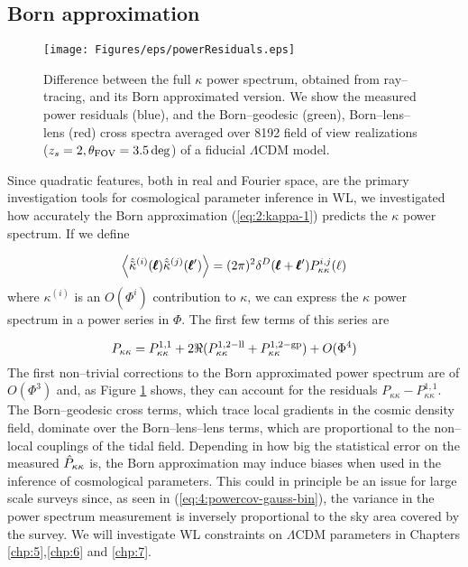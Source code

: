 \subsection{Born approximation}
\label{sec:4:bornpower}
%
\begin{figure}
\begin{center}
\texttt{[image: Figures/eps/powerResiduals.eps]}
\end{center}
\caption{Difference between the full $\kappa$ power spectrum, obtained from ray--tracing, and its Born approximated version. We show the measured power residuals (blue), and the Born--geodesic (green), Born--lens--lens (red) cross spectra averaged over 8192 field of view realizations ($z_s=2, \theta_{\rm FOV}=3.5\,{\rm deg}$) of a fiducial $\Lambda$CDM model.}
\label{fig:4:powerRes}
\end{figure}
%
Since quadratic features, both in real and Fourier space, are the primary investigation tools for cosmological parameter inference in WL, we investigated how accurately the Born approximation (\ref{eq:2:kappa-1}) predicts the $\kappa$ power spectrum. If we define 

\begin{equation}
\label{eq:4:power-cross}
\left\langle\hat{\tilde{\kappa}}^{(i)}(\pmb{\ell})\hat{\tilde{\kappa}}^{(j)}(\pmb{\ell}')\right\rangle = (2\pi)^2\delta^D(\pmb{\ell}+\pmb{\ell}')P^{i,j}_{\kappa\kappa}(\ell)
\end{equation}
%
where $\kappa^{(i)}$ is an $O(\Phi^i)$ contribution to $\kappa$, we can express the $\kappa$ power spectrum in a power series in $\Phi$. The first few terms of this series are 

\begin{equation}
\label{eq:4:power-pert}
P_{\kappa\kappa} = P_{\kappa\kappa}^{1,1} + 2\Re (P^{1,2-{\rm ll}}_{\kappa\kappa}+P^{1,2-{\rm gp}}_{\kappa\kappa}) + O(\Phi^4) 
\end{equation}
%
The first non--trivial corrections to the Born approximated power spectrum are of $O(\Phi^3)$ and, as Figure \ref{fig:4:powerRes} shows, they can account for the residuals $P_{\kappa\kappa}-P^{1,1}_{\kappa\kappa}$. The Born--geodesic cross terms, which trace local gradients in the cosmic density field, dominate over the Born--lens--lens terms, which are proportional to the non--local couplings of the tidal field. Depending in how big the statistical error on the measured $\hat{P}_{\kappa\kappa}$ is, the Born approximation may induce biases when used in the inference of cosmological parameters. This could in principle be an issue for large scale surveys since, as seen in (\ref{eq:4:powercov-gauss-bin}), the variance in the power spectrum measurement is inversely proportional to the sky area covered by the survey. We will investigate WL constraints on $\Lambda$CDM parameters in Chapters \ref{chp:5},\ref{chp:6} and \ref{chp:7}.    

